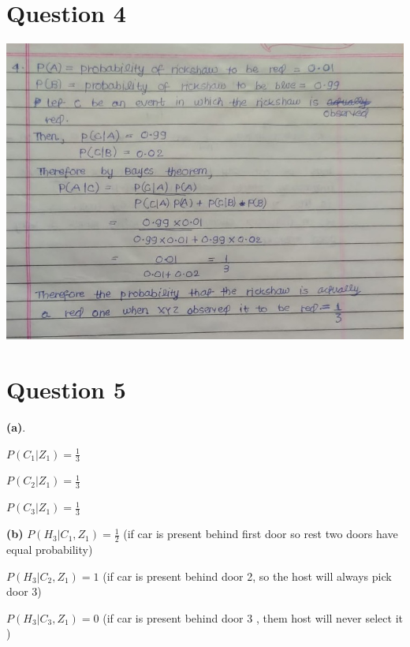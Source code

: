 \documentclass{article}
\theoremstyle{remark}
\begin{document}
\section{Question 4}
\begin{center}
    \includegraphics[width=\textwidth,height=\textheight,keepaspectratio]{q4_1.jpeg}
\end{center}
\newpage
\section{Question 5}
\hspace{2.5em} \textbf{(a)}.
\begin{center}
    \hspace{1.25em}$P(C_1|Z_1)= \frac{1}{3}$ \par
    \hspace{1.25em}$P(C_2|Z_1)=\frac{1}{3}$ \par
    \hspace{1.25em}$P(C_3|Z_1)=\frac{1}{3}$ \par
\end{center}

\hspace{2.5em} \textbf{(b)}
$P(H_3|C_1, Z_1)=\frac{1}{2}$ (if car is present behind first door so rest two doors have equal probability)\par
$P(H_3|C_2, Z_1)=1$ (if car is present behind door 2, so the host will always pick door 3) \par
$P(H_3|C_3, Z_1)=0$ (if  car is present behind door 3 , them host will never select it )\par
\end{document}
